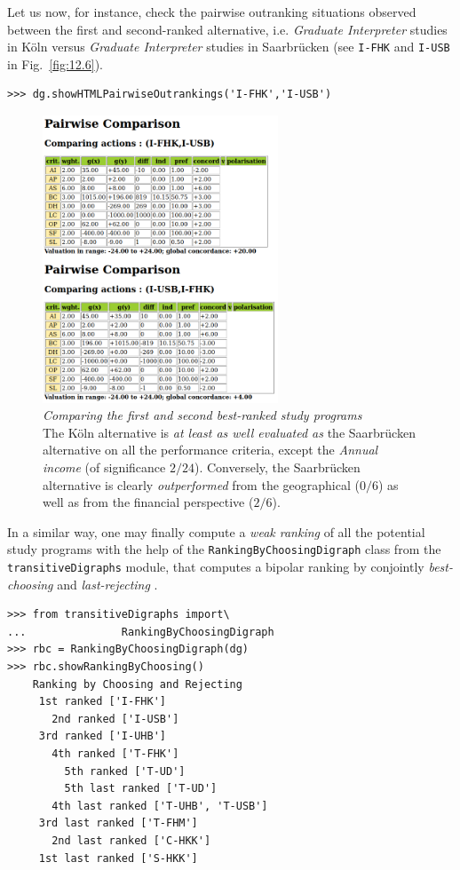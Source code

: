 Let us now, for instance, check the pairwise outranking situations observed between the first and second-ranked alternative, i.e. \emph{Graduate Interpreter} studies in Köln versus \emph{Graduate Interpreter} studies in Saarbrücken (see \texttt{I-FHK} and \texttt{I-USB} in Fig.~\vref{fig:12.6}).
\begin{lstlisting}
>>> dg.showHTMLPairwiseOutrankings('I-FHK','I-USB')
\end{lstlisting}
\begin{figure}[ht]
\sidecaption[t]
\includegraphics[width=7cm]{Figures/12-6-pairwiseComparison.png}
\caption[Comparing the first and second best-ranked study programs]{\emph{Comparing the first and second best-ranked study programs}\\ The Köln alternative is \emph{at least as well evaluated as} the Saarbrücken alternative on all the performance criteria, except the \emph{Annual income} (of significance $2/24$). Conversely, the Saarbrücken alternative is clearly \emph{outperformed} from the geographical ($0/6$) as well as from the financial perspective ($2/6$).}
\label{fig:12.6}       %
\end{figure}

In a similar way, one may finally compute a \emph{weak ranking} of all the potential study programs with the help of the \texttt{RankingByChoosingDigraph} class from the \texttt{transitiveDigraphs} module, that computes a bipolar ranking by conjointly \emph{best-choosing} and \emph{last-rejecting} \citep{BIS-1999}.
\begin{lstlisting}[caption={Weakly ranking by bipolar best-choosing and last-rejecting},label=list:12.6]
>>> from transitiveDigraphs import\
...               RankingByChoosingDigraph
>>> rbc = RankingByChoosingDigraph(dg)
>>> rbc.showRankingByChoosing()
    Ranking by Choosing and Rejecting
     1st ranked ['I-FHK'] 
       2nd ranked ['I-USB']
	 3rd ranked ['I-UHB']
	   4th ranked ['T-FHK']
	     5th ranked ['T-UD']
	     5th last ranked ['T-UD']
	   4th last ranked ['T-UHB', 'T-USB']
	 3rd last ranked ['T-FHM']
       2nd last ranked ['C-HKK']
     1st last ranked ['S-HKK']
\end{lstlisting}


